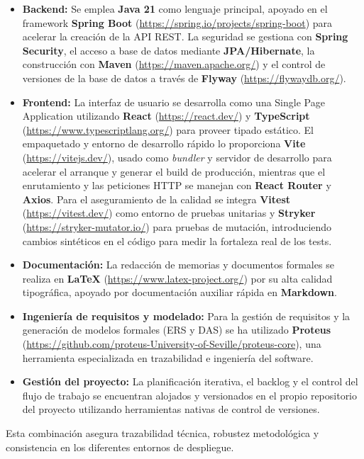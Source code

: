 \begin{itemize}
    \item \textbf{Backend:} Se emplea \textbf{Java 21} como lenguaje principal, apoyado en el framework \textbf{Spring Boot} (\url{https://spring.io/projects/spring-boot}) para acelerar la creaci\'on de la API REST. La seguridad se gestiona con \textbf{Spring Security}, el acceso a base de datos mediante \textbf{JPA/Hibernate}, la construcci\'on con \textbf{Maven} (\url{https://maven.apache.org/}) y el control de versiones de la base de datos a trav\'es de \textbf{Flyway} (\url{https://flywaydb.org/}).
    \item \textbf{Frontend:} La interfaz de usuario se desarrolla como una Single Page Application utilizando \textbf{React} (\url{https://react.dev/}) y \textbf{TypeScript} (\url{https://www.typescriptlang.org/}) para proveer tipado est\'atico. El empaquetado y entorno de desarrollo r\'apido lo proporciona \textbf{Vite} (\url{https://vitejs.dev/}), usado como \emph{bundler} y servidor de desarrollo para acelerar el arranque y generar el build de producci\'on, mientras que el enrutamiento y las peticiones HTTP se manejan con \textbf{React Router} y \textbf{Axios}. Para el aseguramiento de la calidad se integra \textbf{Vitest} (\url{https://vitest.dev/}) como entorno de pruebas unitarias y \textbf{Stryker} (\url{https://stryker-mutator.io/}) para pruebas de mutaci\'on, introduciendo cambios sint\'eticos en el c\'odigo para medir la fortaleza real de los tests.
    \item \textbf{Documentaci\'on:} La redacci\'on de memorias y documentos formales se realiza en \textbf{\LaTeX{}} (\url{https://www.latex-project.org/}) por su alta calidad tipogr\'afica, apoyado por documentaci\'on auxiliar r\'apida en \textbf{Markdown}.
    \item \textbf{Ingenier\'ia de requisitos y modelado:} Para la gesti\'on de requisitos y la generaci\'on de modelos formales (ERS y DAS) se ha utilizado \textbf{Proteus} (\url{https://github.com/proteus-University-of-Seville/proteus-core}), una herramienta especializada en trazabilidad e ingenier\'ia del software.
    \item \textbf{Gesti\'on del proyecto:} La planificaci\'on iterativa, el backlog y el control del flujo de trabajo se encuentran alojados y versionados en el propio repositorio del proyecto utilizando herramientas nativas de control de versiones.
\end{itemize}

Esta combinaci\'on asegura trazabilidad t\'ecnica, robustez metodol\'ogica y consistencia en los diferentes entornos de despliegue.

